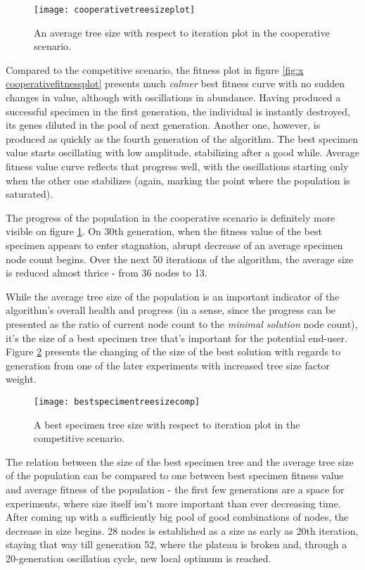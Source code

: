 \begin{figure}[h]
    \centering
    \texttt{[image: cooperativetreesizeplot]}
    \caption{An average tree size with respect to iteration plot in the cooperative scenario.}
    \label{fig:x cooperativetreesizeplot}
\end{figure}

Compared to the competitive scenario, the fitness plot in figure \ref{fig:x cooperativefitnessplot} presents much \textit{calmer} best fitness curve with no sudden changes in value, although with oscillations in abundance. Having produced a successful specimen in the first generation, the individual is instantly destroyed, its genes diluted in the pool of next generation. Another one, however, is produced as quickly as the fourth generation of the algorithm. The best specimen value starts oscillating with low amplitude, stabilizing after a good while. Average fitness value curve reflects that progress well, with the oscillations starting only when the other one stabilizes (again, marking the point where the population is saturated).

The progress of the population in the cooperative scenario is definitely more visible on figure \ref{fig:x cooperativetreesizeplot}. On 30th generation, when the fitness value of the best specimen appears to enter stagnation, abrupt decrease of an average specimen node count begins. Over the next 50 iterations of the algorithm, the average size is reduced almost thrice - from 36 nodes to 13.

While the average tree size of the population is an important indicator of the algorithm's overall health and progress (in a sense, since the progress can be presented as the ratio of current node count to the \textit{minimal solution} node count), it's the size of a best specimen tree that's important for the potential end-user. Figure \ref{fig:x competitivebestspecimentreesizeplot} presents the changing of the size of the best solution with regards to generation from one of the later experiments with increased tree size factor weight.

\begin{figure}[h]
    \centering
    \texttt{[image: bestspecimentreesizecomp]}
    \caption{A best specimen tree size with respect to iteration plot in the competitive scenario.}
    \label{fig:x competitivebestspecimentreesizeplot}
\end{figure}

The relation between the size of the best specimen tree and the average tree size of the population can be compared to one between best specimen fitness value and average fitness of the population - the first few generations are a space for experiments, where size itself isn't more important than ever decreasing time. After coming up with a sufficiently big pool of good combinations of nodes, the decrease in size begins. 28 nodes is established as a size as early as 20th iteration, staying that way till generation 52, where the plateau is broken and, through a 20-generation oscillation cycle, new local optimum is reached.


